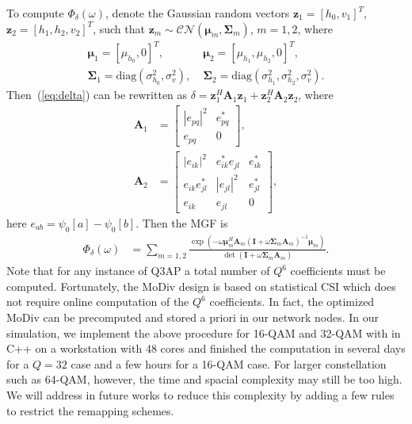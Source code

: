 \documentclass[journal]{IEEEtran}
\begin{document}
To compute $\Phi_{\delta}(\omega)$, denote the Gaussian random vectors
$\mathbf{z}_1 = [h_0, v_1]^T$, $\mathbf{z}_{2} = [h_1, h_2, v_2]^T$, such
that $\mathbf{z}_m\sim\mathcal{CN}(\bm{\mu}_m, \mathbf{\Sigma}_m)$, $m=1,2$,
where
\begin{align}
    \bm{\mu}_1 = [\mu_{h_0}, 0]^T,& \; \bm{\mu}_{2} = [\mu_{h_1}, \mu_{h_2},
    0]^T,
    \\
    \mathbf{\Sigma}_1 = \mbox{diag}\left(\sigma_{h_0}^2, \sigma_v^2\right), & \;
    \mathbf{\Sigma}_2 = \mbox{diag}\left(\sigma_{h_1}^2, \sigma_{h_2}^2,
    \sigma_v^2\right).
\end{align}
Then~(\ref{eq:delta}) can be rewritten as $\delta =
\mathbf{z}_1^H\mathbf{A}_1\mathbf{z}_1 +
\mathbf{z}_{2}^H\mathbf{A}_{2}\mathbf{z}_{2}$, where
\begin{subequations}
    \begin{align}
        \mathbf{A}_1 & = \left[
            \begin{array}{cc}
                |e_{pq}|^2  & e_{pq}^* \\
                e_{pq} & 0
            \end{array}
        \right], \\
        \mathbf{A}_2 & = \left[
            \begin{array}{ccc}
            |e_{ik}|^2 & e_{ik}^*e_{jl} & e_{ik}^*
            \\
            e_{ik}e_{jl}^* & |e_{jl}|^2 & e_{jl}^*
            \\
            e_{ik} & e_{jl} & 0
        \end{array}
        \right],
    \end{align}
\end{subequations}
here $e_{ab} = \psi_0[a] - \psi_0[b]$. Then the MGF
is
\begin{align}
    \Phi_{\delta}(\omega) & = \sum_{m=1,2}
    \frac{\exp(-\omega\bm{\mu}_m^H\mathbf{A}_m(\mathbf{I} +
    \omega\mathbf{\Sigma}_m\mathbf{A}_m)^{-1}\bm{\mu}_m)}{\det(\mathbf{I} +
    \omega\mathbf{\Sigma}_m\mathbf{A}_m)}.
\end{align}
Note that for any instance of Q3AP a total number of $Q^6$ coefficients must be
computed. Fortunately, the MoDiv design is based on statistical CSI which does
not require online computation of the $Q^6$ coefficients. In fact, the optimized
MoDiv can be precomputed and stored a priori in our network nodes. In our
simulation, we implement the above procedure for 16-QAM and 32-QAM with in C++
on a workstation with 48 cores and finished the computation in several days for
a $Q=32$ case and a few hours for a 16-QAM case. For larger constellation such
as 64-QAM, however, the time and spacial complexity may still be too high. We
will address in future works to reduce this complexity by adding a few rules to
restrict the remapping schemes.
\end{document}
